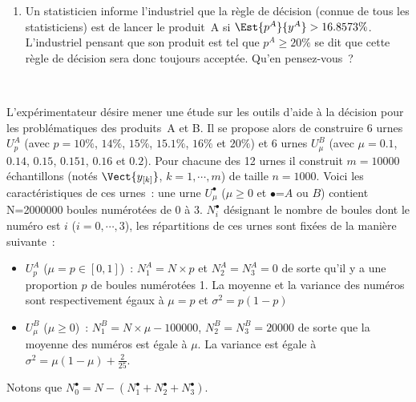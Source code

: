 \documentclass[10pt]{report}
\begin{document}
\begin{exercice}
\begin{enumerate}
\item Un statisticien informe l'industriel que la règle de décision (connue de tous les statisticiens) est de lancer le produit~A si $\Est{p^A}{y^A}>16.8573\%$. L'industriel pensant que son produit est tel que $p^A\geq 20\%$ se dit que cette règle de décision sera donc toujours acceptée. Qu'en pensez-vous~? 


\end{enumerate}
\end{exercice}


\begin{exercice} $ $

L'expérimentateur désire mener une étude sur les outils d'aide à la décision pour les problématiques des produits~A et B. Il se propose alors de construire 6 urnes $U^A_p$ (avec $p=10\%$, $14\%$, $15\%$, $15.1\%$, $16\%$ et $20\%$) et 6 urnes $U^B_\mu$ (avec $\mu=0.1$, $0.14$, $0.15$, $0.151$, $0.16$ et $0.2$). Pour chacune des 12 urnes il construit $m=10000$ échantillons (notés $\Vect{y_{[k]}}$, $k=1,\cdots,m$) de taille $n=1000$. Voici les caractéristiques de ces urnes~:
une urne $U^\bullet_\mu$ ($\mu\geq0$ et $\bullet$=$A$ ou $B$) contient N=2000000 boules numérotées de 0 à 3. $N^\bullet_i$ désignant le nombre de boules dont le numéro est $i$ ($i=0,\cdots,3$), les répartitions de ces urnes sont fixées de la manière suivante~:
\begin{itemize}
\item $U^A_p$ ($\mu=p\in [0,1]$)~: $N^A_1=N\times p$ et $N^A_2=N^A_3=0$ de sorte qu'il y a une proportion $p$ de boules numérotées 1. La moyenne et la variance des numéros sont respectivement égaux à $\mu=p$ et $\sigma^2=p(1-p)$
\item $U^B_\mu$ ($\mu\geq0$)~: $N^B_1=N\times \mu -100000$, $N^B_2=N^B_3=20000$ de sorte que la moyenne des numéros est égale à $\mu$. La variance est égale à $\sigma^2=\mu(1-\mu)+\frac{2}{25}$.
\end{itemize}
Notons que $N^\bullet_0=N-(N^\bullet_1+N^\bullet_2+N^\bullet_3)$.


\end{exercice}
\end{document}
